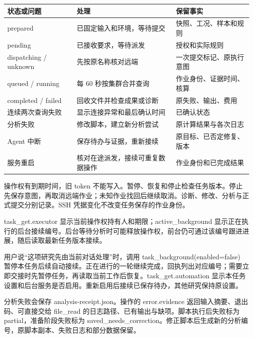 \documentclass[11pt,a4paper]{ctexart}
\begin{document}
\begin{longtable}{p{4.67cm}p{4.67cm}p{4.67cm}}
\toprule
状态或问题 & 处理 & 保留事实 \\
\midrule\endhead
prepared & 已固定输入和环境，等待提交 & 快照、工况、样本和规则 \\
pending & 已接收要求，等待派发 & 授权和实际规则 \\
dispatching /\allowbreak{} unknown & 先按原名称核对远端 & 一次提交标记、原执行意图 \\
queued /\allowbreak{} running & 每 60 秒按集群合并查询 & 作业身份、证据时间、核算 \\
completed /\allowbreak{} failed & 回收文件并检查成果或诊断 & 原失败、输出、费用 \\
连续两次查询失败 & 显示连接异常和最后确认时间 & 已确认状态 \\
分析失败 & 修改脚本，建立新分析尝试 & 原计算结果与各次日志 \\
Agent 中断 & 保存待办与证据，重新接续 & 原目标、已否定修复、版本 \\
服务重启 & 核对在途派发，接续可重复数据操作 & 作业身份和已完成结果 \\
\bottomrule
\end{longtable}


操作权有到期时间，旧 token 不能写入。暂停、恢复和停止检查任务版本。停止先保存意图，再取消远端作业；未知作业找回后继续取消。诊断、修改、分析与正式提交分别记录。SSH 凭据变化不改变任务保存的作业身份。



task\_\allowbreak{}get.executor 显示当前操作权持有人和期限；active\_\allowbreak{}background 显示正在执行的后台接续编号。后台等待分析时可能释放操作权，前台仍可通过该编号跟进进展，随后读取最新任务版本接续。



用户说“这项研究先由当前对话处理”时，调用 task\_\allowbreak{}background(enabled=false) 暂停本任务后续自动接续。正在进行的一轮继续完成，回执列出对应编号；需要立即交接时先暂停任务，再读取当前工作后恢复。task\_\allowbreak{}get.automation 显示本任务设置和后台服务是否启用。重新启用后接续已保存待办，其他研究保持原设置。



分析失败会保存 analysis-receipt.json。操作的 error.evidence 返回输入摘要、退出码、可直接交给 file\_\allowbreak{}read 的日志路径、已有输出与缺项。脚本执行后失败标为 partial，准备阶段失败标为 saved\_\allowbreak{}needs\_\allowbreak{}correction。修正脚本后生成新的分析编号，原脚本副本、失败日志和部分数据保留。
\end{document}
